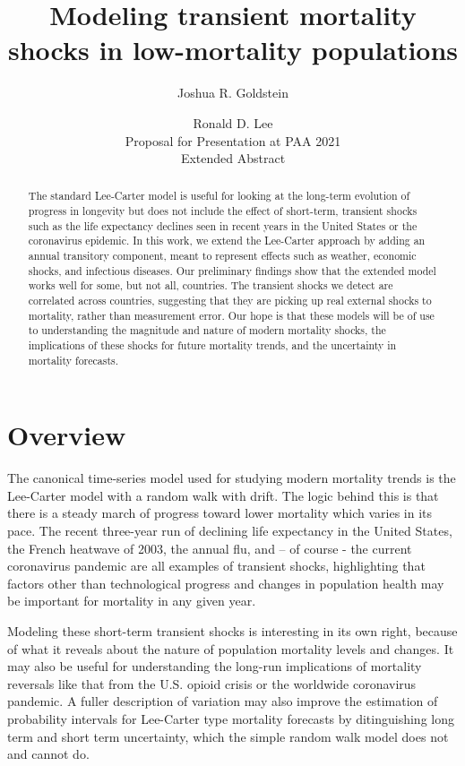 \documentclass[12pt]{article}
\title{Modeling transient mortality shocks in low-mortality populations}
\author{Joshua R. Goldstein \and Ronald D. Lee \\ Proposal for
  Presentation at PAA 2021 \\ Extended Abstract}
\begin{document}
\maketitle
\begin{abstract}

  The standard Lee-Carter model is useful for looking at the long-term
  evolution of progress in longevity but does not include the effect
  of short-term, transient shocks such as the life expectancy declines
  seen in recent years in the United States or the coronavirus
  epidemic.  In this work, we extend the Lee-Carter approach by adding
  an annual transitory component, meant to represent effects such as
  weather, economic shocks, and infectious diseases. Our preliminary
  findings show that the extended model works well for some, but not
  all, countries. The transient shocks we detect are correlated across
  countries, suggesting that they are picking up real external shocks
  to mortality, rather than measurement error. Our hope is that these
  models will be of use to understanding the magnitude and nature of
  modern mortality shocks, the implications of these shocks for
  future mortality trends, and the uncertainty in mortality forecasts.
  
  
\end{abstract}

\section{Overview}


The canonical time-series model used for studying modern mortality
trends is the Lee-Carter model with a random walk with drift. The
logic behind this is that there is a steady march of progress toward
lower mortality which varies in its pace. The recent three-year run of
declining life expectancy in the United States, the French heatwave of 2003,
the annual flu, and -- of course - the current coronavirus pandemic 
are all examples of transient shocks, highlighting that factors other
than technological progress and changes in population health
may be important for mortality in any given year.

Modeling these short-term transient shocks is interesting in its own
right, because of what it reveals about the nature of population
mortality levels and changes.  It may also be useful for understanding
the long-run implications of mortality reversals like that from the
U.S. opioid crisis or the worldwide coronavirus pandemic. A fuller
description of variation may also improve the estimation of
probability intervals for Lee-Carter type mortality forecasts by
ditinguishing long term and short term uncertainty, which the simple
random walk model does not and cannot do.
\end{document}
